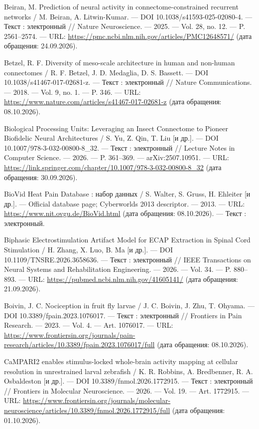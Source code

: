 \begin{list}{}{\setlength{\leftmargin}{10mm}\setlength{\labelwidth}{8mm}\setlength{\labelsep}{2mm}\setlength{\itemsep}{0pt}\setlength{\parsep}{0pt}\setlength{\topsep}{0pt}}
\item[42.] Beiran, M. Prediction of neural activity in connectome-constrained recurrent networks / M. Beiran, A. Litwin-Kumar. — DOI 10.1038/s41593-025-02080-4. — Текст : электронный // Nature Neuroscience. — 2025. — Vol. 28, no. 12. — P. 2561–2574. — URL: \url{https://pmc.ncbi.nlm.nih.gov/articles/PMC12648571/} (дата обращения: 24.09.2026).
\item[43.] Betzel, R. F. Diversity of meso-scale architecture in human and non-human connectomes / R. F. Betzel, J. D. Medaglia, D. S. Bassett. — DOI 10.1038/s41467-017-02681-z. — Текст : электронный // Nature Communications. — 2018. — Vol. 9, no. 1. — P. 346. — URL: \url{https://www.nature.com/articles/s41467-017-02681-z} (дата обращения: 08.10.2026).
\item[44.] Biological Processing Units: Leveraging an Insect Connectome to Pioneer Biofidelic Neural Architectures / S. Yu, Z. Qin, T. Liu [и др.]. — DOI 10.1007/978-3-032-00800-8\_32. — Текст : электронный // Lecture Notes in Computer Science. — 2026. — P. 361–369. — arXiv:2507.10951. — URL: \url{https://link.springer.com/chapter/10.1007/978-3-032-00800-8\_32} (дата обращения: 30.09.2026).
\item[45.] BioVid Heat Pain Database : набор данных / S. Walter, S. Gruss, H. Ehleiter [и др.]. — Official database page; Cyberworlds 2013 descriptor. — 2013. — URL: \url{https://www.nit.ovgu.de/BioVid.html} (дата обращения: 08.10.2026). — Текст : электронный.
\item[46.] Biphasic Electrostimulation Artifact Model for ECAP Extraction in Spinal Cord Stimulation / H. Zhang, X. Luo, B. Ma [и др.]. — DOI 10.1109/TNSRE.2026.3658636. — Текст : электронный // IEEE Transactions on Neural Systems and Rehabilitation Engineering. — 2026. — Vol. 34. — P. 880–893. — URL: \url{https://pubmed.ncbi.nlm.nih.gov/41605141/} (дата обращения: 21.09.2026).
\item[47.] Boivin, J. C. Nociception in fruit fly larvae / J. C. Boivin, J. Zhu, T. Ohyama. — DOI 10.3389/fpain.2023.1076017. — Текст : электронный // Frontiers in Pain Research. — 2023. — Vol. 4. — Art. 1076017. — URL: \url{https://www.frontiersin.org/journals/pain-research/articles/10.3389/fpain.2023.1076017/full} (дата обращения: 08.10.2026).
\item[48.] CaMPARI2 enables stimulus-locked whole-brain activity mapping at cellular resolution in unrestrained larval zebrafish / K. R. Robbins, A. Bredbenner, R. A. Osbaldeston [и др.]. — DOI 10.3389/fnmol.2026.1772915. — Текст : электронный // Frontiers in Molecular Neuroscience. — 2026. — Vol. 19. — Art. 1772915. — URL: \url{https://www.frontiersin.org/journals/molecular-neuroscience/articles/10.3389/fnmol.2026.1772915/full} (дата обращения: 01.10.2026).

\end{list}
